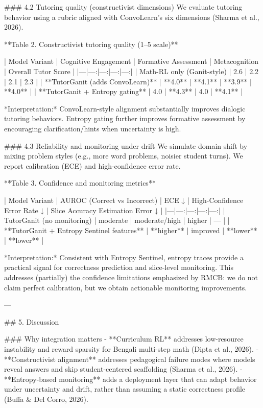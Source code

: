 ### 4.2 Tutoring quality (constructivist dimensions)  
We evaluate tutoring behavior using a rubric aligned with ConvoLearn’s six dimensions (Sharma et al., 2026).

**Table 2. Constructivist tutoring quality (1–5 scale)**

| Model Variant | Cognitive Engagement | Formative Assessment | Metacognition | Overall Tutor Score |
|---|---:|---:|---:|---:|
| Math-RL only (Ganit-style) | 2.6 | 2.2 | 2.1 | 2.3 |
| **TutorGanit (adds ConvoLearn)** | **4.0** | **4.1** | **3.9** | **4.0** |
| **TutorGanit + Entropy gating** | 4.0 | **4.3** | 4.0 | **4.1** |

*Interpretation:* ConvoLearn-style alignment substantially improves dialogic tutoring behaviors. Entropy gating further improves formative assessment by encouraging clarification/hints when uncertainty is high.

### 4.3 Reliability and monitoring under drift  
We simulate domain shift by mixing problem styles (e.g., more word problems, noisier student turns). We report calibration (ECE) and high-confidence error rate.

**Table 3. Confidence and monitoring metrics**

| Model Variant | AUROC (Correct vs Incorrect) | ECE ↓ | High-Confidence Error Rate ↓ | Slice Accuracy Estimation Error ↓ |
|---|---:|---:|---:|---:|
| TutorGanit (no monitoring) | moderate | moderate/high | higher | — |
| **TutorGanit + Entropy Sentinel features** | **higher** | improved | **lower** | **lower** |

*Interpretation:* Consistent with Entropy Sentinel, entropy traces provide a practical signal for correctness prediction and slice-level monitoring. This addresses (partially) the confidence limitations emphasized by RMCB: we do not claim perfect calibration, but we obtain actionable monitoring improvements.

---

## 5. Discussion  

### Why integration matters  
- **Curriculum RL** addresses low-resource instability and reward sparsity for Bengali multi-step math (Dipta et al., 2026).  
- **Constructivist alignment** addresses pedagogical failure modes where models reveal answers and skip student-centered scaffolding (Sharma et al., 2026).  
- **Entropy-based monitoring** adds a deployment layer that can adapt behavior under uncertainty and drift, rather than assuming a static correctness profile (Buffa & Del Corro, 2026).  

